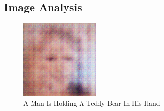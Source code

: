 \documentclass{article}%
\begin{document}
%
\subsection{Image Analysis}%
\label{subsec:ImageAnalysis}%


\begin{figure}[h!]%
\centering%
\includegraphics[width=150px]{500_fake_images/samples_5_86.png}%
\caption{A Man Is Holding A Teddy Bear In His Hand}%
\end{figure}

%
\end{document}
